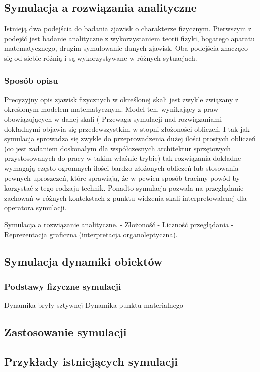 \subsection{Symulacja a rozwiązania analityczne}
Istnieją dwa podejścia do badania zjawisk o charakterze fizycznym.
Pierwszym z podejść jest badanie analityczne z wykorzystaniem teorii fizyki, bogatego aparatu matematycznego, drugim symulowanie danych zjawisk.
Oba podejścia znacząco się od siebie różnią i są wykorzystywane w różnych sytuacjach.

\subsubsection{Sposób opisu}
Precyzyjny opis zjawisk fizycznych w określonej skali jest zwykle związany z określonym modelem matematycznym. Model ten, wynikający z praw obowiązujących w danej skali (
Przewaga symulacji nad rozwiązaniami dokładnymi objawia się przedewszystkim w stopni złożoności obliczeń. I tak jak symulacja sprowadza się zwykle do przeprowadzenia dużej ilości prostych obliczeń (co jest zadaniem doskonałym dla współczesnych architektur sprzętowych przystosowanych do pracy w takim właśnie trybie) tak rozwiązania dokładne wymagają często ogromnych ilości bardzo złożonych obliczeń lub stosowania pewnych uproszczeń, które sprawiają, że w pewien sposób tracimy powód by korzystać z tego rodzaju technik.
Ponadto symulacja pozwala na przeglądanie zachowań w różnych kontekstach z punktu widzenia skali interpretowalenej dla operatora symulacji.

Symulacja a rozwiązanie analityczne.
- Złożoność
- Liczność przeglądania
- Reprezentacja graficzna (interpretacja organoleptyczna).

\subsection{Symulacja dynamiki obiektów}
\subsubsection{Podstawy fizyczne symulacji}
Dynamika bryły sztywnej
Dynamika punktu materialnego
\subsection{Zastosowanie symulacji}
\subsection{Przykłady istniejących symulacji}

